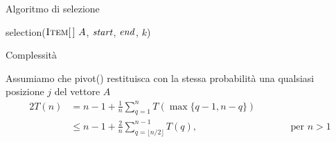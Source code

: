 \begin{frame}{Algoritmo di selezione}

\vspace{-12pt}
\small
\begin{Procedure}
\caption[A]{\Item \textsf{selection}($\textsc{Item}[\,]\ A$, \INTEGER $\mathit{start}$, \INTEGER $\mathit{end}$, \INTEGER $k$)}
\end{Procedure}
\vspace{-18pt}

\end{frame}

\begin{frame}{Complessità}

\vspace{-9pt}

\bigskip
{}
Assumiamo che \textsf{pivot}() restituisca con la stessa probabilità una qualsiasi posizione $j$ del vettore $A$
\begin{alignat*}{2}
T(n) &= n-1 + \frac{1}{n}\sum_{q=1}^{n} T\left(\max\{q-1, n-q\}\right)\\
     &\le n-1 + \frac{2}{n} \sum_{q=\lfloor n/2\rfloor}^{n-1} T(q), &&\qquad\textrm{per $n > 1$}
\end{alignat*}


\end{frame}

